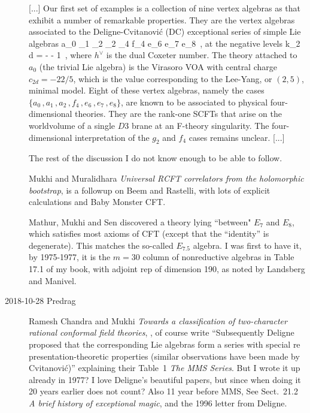 \begin{description}
[...] Our first set of examples is a collection of nine vertex algebras as that
exhibit a number of remarkable properties. They are the vertex algebras
associated to the Deligne-Cvitanovi{\'c} (DC) exceptional series of simple Lie
algebras
\beq
{a}_0 _1 _2 _2 _4
\subset f_4 \subset e_6 \subset e_7 \subset e_8
\,,
at the negative levels
\beq k_{2 d} = -  - 1
\,,
where $h^\vee$ is the dual Coxeter number. The theory attached to ${a}_0$
(the trivial Lie algebra) is the Virasoro VOA with central charge
$c_{2d}=-22/5$, which is the value corresponding to the Lee-Yang, or $(2,5)$,
minimal model. Eight of these vertex algebras, namely the cases
$\{{a}_0\,,{a}_1\,,{a}_2\,,{f}_4\,,{e}_6\,,{e}_7\,,{e}_8\}$,
are known to be associated to physical four-dimensional theories. They are the
rank-one SCFTs that arise on the worldvolume of a single $D3$ brane at an
F-theory singularity. The four-dimensional interpretation of the ${g}_2$ and
${f}_4$ cases remains unclear.
[...]

The rest of the discussion I do not know enough to be able to follow.

Mukhi and Muralidhara
{\em Universal {RCFT} correlators from the holomorphic bootstrap},
 is a followup on Beem and Rastelli,
with lots of explicit calculations and Baby Monster CFT.

Mathur, Mukhi and Sen discovered a theory lying ``between" $E_7$ and
$E_8$, which satisfies most axioms of CFT (except that the ``identity'' is
degenerate). This matches the so-called $E_{7.5}$ algebra. I
was first to have it, by 1975-1977, it is the $m=30$ column of
nonreductive algebras in Table 17.1 of my book, with adjoint rep of
dimension 190, as noted by Landsberg and Manivel.

\item[2018-10-28 Predrag]
Ramesh Chandra and Mukhi
{\em Towards a classification of two-character rational conformal field theories},
,
of course write
``Subsequently Deligne proposed that the corresponding Lie algebras form
a series with special re presentation-theoretic properties (similar observations
have been made by Cvitanovi{\'c})''
explaining their Table~1
{\em The MMS Series}. But I wrote it up already in
1977? I love Deligne's beautiful papers, but since when doing it 20 years earlier
does not count? Also 11 year before MMS, See Sect.~21.2 {\em A brief history of exceptional magic}, and the
 {1996 letter}
from Deligne.


\end{description}
